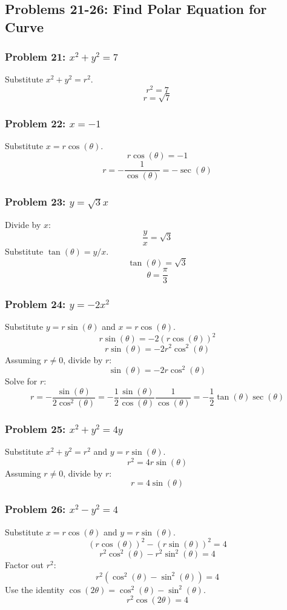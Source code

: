 \documentclass{article}
\begin{document}
\subsection*{Problems 21-26: Find Polar Equation for Curve}

\subsubsection*{Problem 21: \(x^2 + y^2 = 7\)}
Substitute \(x^2 + y^2 = r^2\).
\[ r^2 = 7 \]
\[ r = \sqrt{7} \]

\subsubsection*{Problem 22: \(x = -1\)}
Substitute \(x = r \cos(\theta)\).
\[ r \cos(\theta) = -1 \]
\[ r = -\frac{1}{\cos(\theta)} = -\sec(\theta) \]

\subsubsection*{Problem 23: \(y = \sqrt{3}x\)}
Divide by \(x\):
\[ \frac{y}{x} = \sqrt{3} \]
Substitute \(\tan(\theta) = y/x\).
\[ \tan(\theta) = \sqrt{3} \]
\[ \theta = \frac{\pi}{3} \]

\subsubsection*{Problem 24: \(y = -2x^2\)}
Substitute \(y = r \sin(\theta)\) and \(x = r \cos(\theta)\).
\[ r \sin(\theta) = -2(r \cos(\theta))^2 \]
\[ r \sin(\theta) = -2r^2 \cos^2(\theta) \]
Assuming \(r \neq 0\), divide by \(r\):
\[ \sin(\theta) = -2r \cos^2(\theta) \]
Solve for \(r\):
\[ r = -\frac{\sin(\theta)}{2 \cos^2(\theta)} = -\frac{1}{2} \frac{\sin(\theta)}{\cos(\theta)} \frac{1}{\cos(\theta)} = -\frac{1}{2} \tan(\theta) \sec(\theta) \]

\subsubsection*{Problem 25: \(x^2 + y^2 = 4y\)}
Substitute \(x^2 + y^2 = r^2\) and \(y = r \sin(\theta)\).
\[ r^2 = 4r \sin(\theta) \]
Assuming \(r \neq 0\), divide by \(r\):
\[ r = 4 \sin(\theta) \]

\subsubsection*{Problem 26: \(x^2 - y^2 = 4\)}
Substitute \(x = r \cos(\theta)\) and \(y = r \sin(\theta)\).
\[ (r \cos(\theta))^2 - (r \sin(\theta))^2 = 4 \]
\[ r^2 \cos^2(\theta) - r^2 \sin^2(\theta) = 4 \]
Factor out \(r^2\):
\[ r^2 (\cos^2(\theta) - \sin^2(\theta)) = 4 \]
Use the identity \(\cos(2\theta) = \cos^2(\theta) - \sin^2(\theta)\).
\[ r^2 \cos(2\theta) = 4 \]
\end{document}
